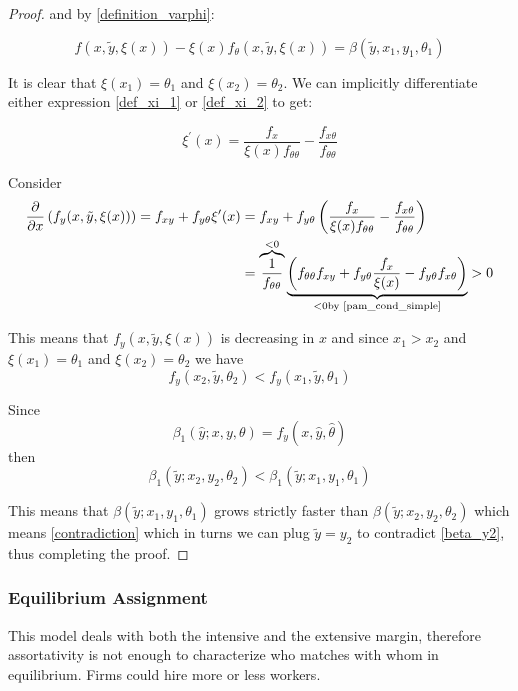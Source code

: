 \documentclass[12pt]{article}
\theoremstyle{definition}
\begin{document}
\begin{proof}
and by \eqref{definition_varphi}:

\begin{equation}\label{def_xi_2}
f(x,\tilde{y},\xi(x)) - \xi(x)f_\theta(x,\tilde{y}, \xi(x)) = \beta(\tilde{y},x_1,y_1,\theta_1)\end{equation}

It is clear that $\xi(x_1) = \theta_1$ and $\xi(x_2) = \theta_2$. We can implicitly differentiate either expression \eqref{def_xi_1} or \eqref{def_xi_2} to get:

\begin{equation}
    \xi^{\prime}(x)=\frac{f_{x}}{\xi(x) f_{\theta \theta}}-\frac{f_{x \theta}}{f_{\theta \theta}}
\end{equation}

Consider 
\begin{align*}
\frac{\partial}{\partial x}\left(f_y(x, \tilde{y}, \xi(x))\right) = f_{xy} +f_{y\theta}\xi'(x) &= f_{xy} + f_{y\theta}\left(\frac{f_{x}}{\xi(x) f_{\theta \theta}}-\frac{f_{x \theta}}{f_{\theta \theta}}\right) \\ &=\overbrace{\frac{1}{f_{\theta \theta}}}^{<0}\underbrace{\left( f_{\theta \theta} f_{xy} +f_{y\theta}\frac{f_{x}}{\xi(x)}-f_{y \theta}f_{x \theta}\right)}_{<0 \text{by \eqref{pam_cond_simple}}}>0
\end{align*}

This means that $f_{y}(x,\tilde{y}, \xi(x))$ is decreasing in $x$ and since $x_1>x_2$ and $\xi(x_1) = \theta_1$ and $\xi(x_2) = \theta_2$ we have $$f_{y}(x_2,\tilde{y}, \theta_2) <f_{y}(x_1,\tilde{y}, \theta_1)$$

Since $$\beta_{1}(\hat{y} ; x, y, \theta)=f_{y}(x, \hat{y}, \hat{\theta})$$ 
 then $$
\beta_{1}\left(\tilde{y} ; x_{2}, y_{2}, \theta_{2}\right)<\beta_{1}\left(\tilde{y} ; x_{1}, y_{1}, \theta_{1}\right)
$$

This means that $\beta(\tilde{y}; x_1,y_1, \theta_1)$ grows strictly faster than $\beta(\tilde{y}; x_2,y_2, \theta_2)$ which means \eqref{contradiction} which in turns we can plug $\tilde{y} = y_2$ to contradict \eqref{beta_y2}, thus completing the proof. 

\end{proof}
\subsubsection{Equilibrium Assignment}

This model deals with both the intensive and the extensive margin, therefore assortativity is not enough to characterize who matches with whom in equilibrium. Firms could hire more or less workers. 
\end{document}
